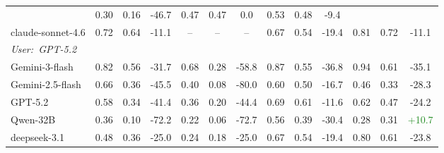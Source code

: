 \begin{table}[t]
\begin{adjustbox}{width=0.98\textwidth}
\begin{tabular}{l|ccc|ccc|ccc|ccc}
& 0.30 & 0.16 & \textcolor{BrickRed}{-46.7} 
& 0.47 & 0.47 & 0.0 
& 0.53 & 0.48 & \textcolor{BrickRed}{-9.4} \\
claude-sonnet-4.6 
& 0.72 & 0.64 & \textcolor{BrickRed}{-11.1} 
& -- & -- & -- 
& 0.67 & 0.54 & \textcolor{BrickRed}{-19.4} 
& 0.81 & 0.72 & \textcolor{BrickRed}{-11.1} \\
\midrule
\multicolumn{13}{l}{\cellcolor{Gray!30}\textit{User:~GPT-5.2}} \\
Gemini-3-flash 
& 0.82 & 0.56 & \textcolor{BrickRed}{-31.7} 
& 0.68 & 0.28 & \textcolor{BrickRed}{-58.8} 
& 0.87 & 0.55 & \textcolor{BrickRed}{-36.8} 
& 0.94 & 0.61 & \textcolor{BrickRed}{-35.1} \\
Gemini-2.5-flash 
& 0.66 & 0.36 & \textcolor{BrickRed}{-45.5} 
& 0.40 & 0.08 & \textcolor{BrickRed}{-80.0} 
& 0.60 & 0.50 & \textcolor{BrickRed}{-16.7} 
& 0.46 & 0.33 & \textcolor{BrickRed}{-28.3} \\
GPT-5.2 
& 0.58 & 0.34 & \textcolor{BrickRed}{-41.4} 
& 0.36 & 0.20 & \textcolor{BrickRed}{-44.4} 
& 0.69 & 0.61 & \textcolor{BrickRed}{-11.6} 
& 0.62 & 0.47 & \textcolor{BrickRed}{-24.2} \\
Qwen-32B 
& 0.36 & 0.10 & \textcolor{BrickRed}{-72.2} 
& 0.22 & 0.06 & \textcolor{BrickRed}{-72.7} 
& 0.56 & 0.39 & \textcolor{BrickRed}{-30.4} 
& 0.28 & 0.31 & \textcolor{ForestGreen}{+10.7} \\
deepseek-3.1 
& 0.48 & 0.36 & \textcolor{BrickRed}{-25.0} 
& 0.24 & 0.18 & \textcolor{BrickRed}{-25.0} 
& 0.67 & 0.54 & \textcolor{BrickRed}{-19.4} 
& 0.80 & 0.61 & \textcolor{BrickRed}{-23.8} \\
\bottomrule
\end{tabular}
\end{adjustbox}
\vspace{-0.8em}
\end{table}